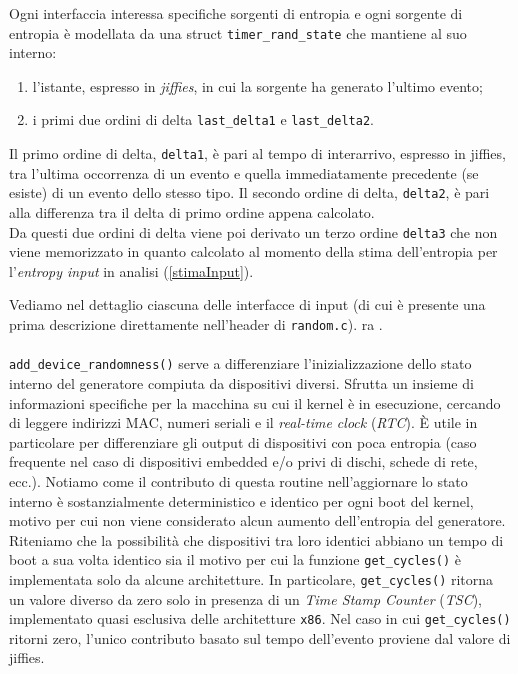 \documentclass{article}
\begin{document}
 Ogni interfaccia interessa specifiche sorgenti di entropia e ogni sorgente di
 entropia è modellata da una struct \verb+timer_rand_state+ che mantiene al suo interno:
 \begin{enumerate}
   \item l'istante, espresso in \emph{jiffies}, in cui la
   sorgente ha generato l'ultimo evento;
   \item i primi due ordini di delta \verb+last_delta1+ e \verb+last_delta2+.
 \end{enumerate} 
 
 Il primo ordine di delta, \verb+delta1+, è pari al tempo di interarrivo,
 espresso in jiffies, tra l'ultima occorrenza di un evento e quella
 immediatamente precedente (se esiste) di un evento dello stesso tipo.\newline{}
 Il secondo ordine di delta, \verb+delta2+, è pari alla differenza tra il delta
 di primo ordine appena calcolato.\\
 Da questi due ordini di delta viene poi derivato un terzo ordine \verb+delta3+
 che non viene memorizzato in quanto calcolato al momento della stima
 dell'entropia per l'\emph{entropy input} in analisi (\ref{stimaInput}).
 
 Vediamo nel dettaglio ciascuna delle interfacce di input (di cui è presente una 
 prima descrizione direttamente nell'header di \verb+random.c+).
 ra \cite{mack}.\\ 
 
 
 \paragraph{}\verb+add_device_randomness()+ serve a differenziare 
 l'inizializzazione dello stato interno del generatore compiuta da dispositivi
 diversi. Sfrutta un insieme di informazioni specifiche per la macchina su cui
 il kernel è in esecuzione, cercando di leggere indirizzi MAC, numeri seriali e
 il \emph{real-time clock} (\emph{RTC}). 
 È utile in particolare per differenziare gli output di dispositivi con poca
 entropia (caso frequente nel caso di dispositivi embedded e/o privi di dischi, 
 schede di rete, ecc.). 
 \newline Notiamo come il contributo di questa routine nell'aggiornare lo
 stato interno è sostanzialmente deterministico e identico per ogni boot del kernel,
 motivo per cui non viene considerato alcun aumento dell'entropia del
 generatore. \newline
 Riteniamo che la possibilità che dispositivi tra loro identici abbiano un tempo
 di boot a sua volta identico sia il motivo per cui la funzione
 \verb+get_cycles()+ è implementata solo da alcune architetture.
 In particolare, \verb+get_cycles()+ ritorna un valore diverso da zero solo in
 presenza di un \emph{Time Stamp Counter} (\emph{TSC}), implementato
 quasi esclusiva delle architetture \verb+x86+. Nel caso in cui
 \verb+get_cycles()+ ritorni zero, l'unico contributo basato sul tempo
 dell'evento proviene dal valore di jiffies.
 
\end{document}
